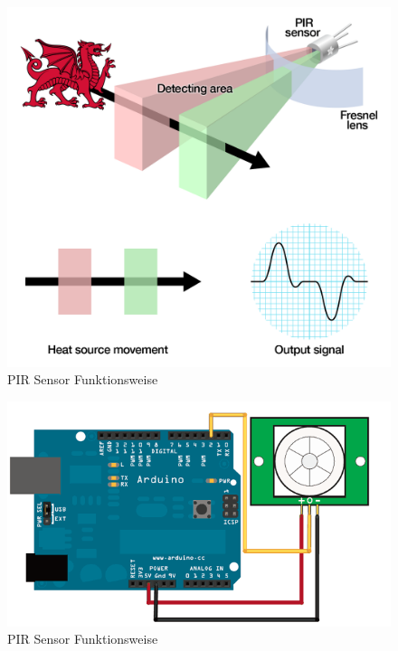 \documentclass[conference]{IEEEtran}
\begin{document}
\begin{figure}
	\begin{center}
		\includegraphics[scale=0.15]{pir4}
	\end{center}
	\caption{PIR Sensor Funktionsweise}
\end{figure}



\begin{figure}
	\begin{center}
		\includegraphics[scale=0.35]{pir5}
	\end{center}
	\caption{PIR Sensor Funktionsweise}
\end{figure}
\end{document}
